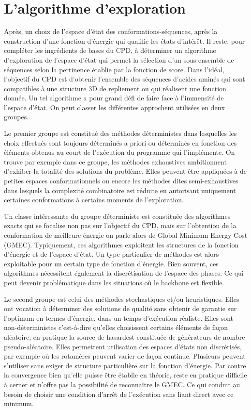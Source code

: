 \section{L'algorithme d'exploration}

Après, un choix de l'espace d'état des conformations-séquences, après la construction d'une fonction d'énergie qui qualifie les états d'intérêt. Il reste, pour compléter les ingrédients de bases du CPD, à déterminer un algorithme d'exploration de l'espace d'état qui permet la sélection d'un sous-ensemble de séquences selon la pertinence établie par la fonction de score. Dans l'idéal, l'objectif du CPD est d'obtenir l'ensemble des séquences d'acides aminés qui sont compatibles à une structure 3D de repliement ou qui réalisent une fonction donnée. Un tel algorithme a pour grand défi de faire face à l'immensité de l'espace d'état. On peut classer les différentes approchent utilisées en deux groupes.

Le premier groupe est constitué des méthodes déterministes dans lesquelles les choix effectués sont toujours déterminés a priori ou déterminés en fonction des éléments obtenus au court de l'exécution du programme qui l'implémente. On trouve par exemple dans ce groupe, les méthodes exhaustives ambitionnent d'exhiber la totalité des solutions du problème. Elles peuvent être appliquées à de petites espaces conformationnels ou encore les méthodes dites semi-exhaustives dans lesquels la complexité combinatoire est réduite en autorisant uniquement certaines conformations à certains moments de l'exploration.

Un classe intéressante du groupe déterministe est constituée des algorithmes exacts qui se focalise non pas sur l'objectif du CPD, mais sur l'obtention de la conformation de meilleure énergie on parle alors de \og Global Minimum Energy Cost \fg (GMEC).
Typiquement, ces algorithmes exploitent les structures de la fonction d'énergie et de l'espace d'état. Un type particulier de méthodes est alors exploitable pour un certain type de fonction d'énergie. Bien souvent, ces algorithmes nécessitent également la discrétisation de l'espace des phases. Ce qui peut devenir problématique dans les situations où le backbone est flexible.
  
Le second groupe est celui des méthodes stochastiques et/ou heuristiques. Elles ont vocation à déterminer des solutions de qualité sans obtenir de garantie sur l'optimum en termes d'énergie, dans un temps d'exécution réaliste. Elles sont non-déterministes c'est-à-dire qu'elles choisissent certains éléments de façon aléatoire, en pratique la \og source de hasard\fg est constituée de générateurs de nombre pseudo-aléatoire. Elles permettent utilisation des espaces d'états non discrétisés, par exemple \cite{Perry12} où les rotamères peuvent varier de façon continue. Plusieurs peuvent s'utiliser sans exiger de structure particulière sur la fonction d'énergie. Par contre la convergence bien qu'elle puisse être établie en théorie, reste en pratique difficile à cerner et n'offre pas la possibilité de reconnaître le GMEC. Ce qui conduit au besoin de choisir une condition d'arrêt de l'exécution sans liant direct avec ce minimum.  

